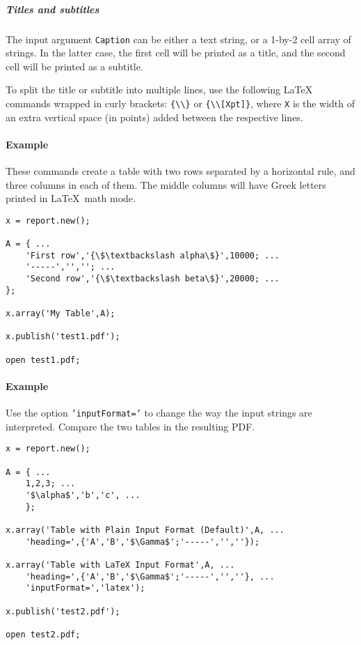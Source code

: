 \subparagraph{Titles and subtitles}\label{titles-and-subtitles}

The input argument \texttt{Caption} can be either a text string, or a
1-by-2 cell array of strings. In the latter case, the first cell will be
printed as a title, and the second cell will be printed as a subtitle.

To split the title or subtitle into multiple lines, use the following
LaTeX commands wrapped in curly brackets:
\texttt{\{\textbackslash{}\textbackslash{}\}} or
\texttt{\{\textbackslash{}\textbackslash{}{[}Xpt{]}\}}, where \texttt{X}
is the width of an extra vertical space (in points) added between the
respective lines.

\paragraph{Example}\label{example}

These commands create a table with two rows separated by a horizontal
rule, and three columns in each of them. The middle columns will have
Greek letters printed in \LaTeX~math mode.

\begin{verbatim}
x = report.new();

A = { ...
    'First row','{\$\textbackslash alpha\$}',10000; ...
    '-----','',''; ...
    'Second row','{\$\textbackslash beta\$}',20000; ...
};

x.array('My Table',A);

x.publish('test1.pdf');

open test1.pdf;
\end{verbatim}

\paragraph{Example}\label{example-1}

Use the option \texttt{'inputFormat='} to change the way the input
strings are interpreted. Compare the two tables in the resulting PDF.

\begin{verbatim}
x = report.new();

A = { ...
    1,2,3; ...
    '$\alpha$','b','c', ...
    };

x.array('Table with Plain Input Format (Default)',A, ...
    'heading=',{'A','B','$\Gamma$';'-----','',''});

x.array('Table with LaTeX Input Format',A, ...
    'heading=',{'A','B','$\Gamma$';'-----','',''}, ...
    'inputFormat=','latex');

x.publish('test2.pdf');

open test2.pdf;
\end{verbatim}


